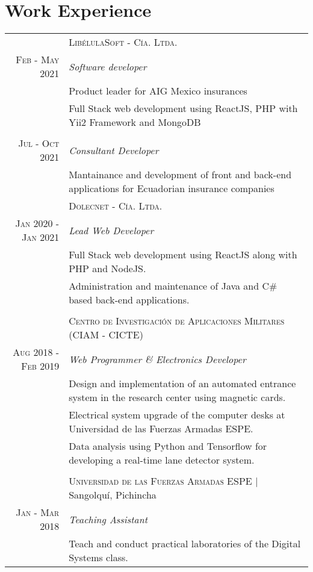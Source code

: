 \documentclass[a4paper,10.9pt]{article}
\begin{document}
\section{Work Experience}
\begin{tabular}{r|p{11cm}}
 &\textsc{LibélulaSoft - Cía. Ltda.} \\
\textsc{Feb - May 2021}&\emph{Software developer}\\
&\footnotesize{Product leader for AIG Mexico insurances}
\\
&\footnotesize{Full Stack web development using ReactJS, PHP with Yii2 Framework and MongoDB}\\
\\
\textsc{Jul - Oct 2021}&\emph{Consultant Developer}\\
&\footnotesize{Mantainance and development of front and back-end applications for Ecuadorian insurance companies}
\multicolumn{2}{c}{} \\ 
 &\textsc{Dolecnet - Cía. Ltda.} \\
\textsc{Jan 2020 - Jan 2021} &\emph{Lead Web Developer}\\&\footnotesize{Full Stack web development using ReactJS along with PHP and NodeJS.}
\\&\footnotesize{Administration and maintenance of Java and C\# based back-end applications.}\\
\multicolumn{2}{c}{} \\ 
&\textsc{Centro de Investigación de Aplicaciones Militares (CIAM - CICTE)} \\
\textsc{Aug 2018 - Feb 2019}&\emph{Web Programmer \& Electronics Developer}\\&\footnotesize{Design and implementation of an automated entrance system in the research center using magnetic cards.}\\&\footnotesize{Electrical system upgrade of the computer desks at Universidad de las Fuerzas Armadas ESPE.}\\&\footnotesize{Data analysis using Python and Tensorflow for developing a real-time lane detector system.}\\
\multicolumn{2}{c}{} \\ 
 &\textsc{Universidad de las Fuerzas Armadas ESPE} | Sangolquí, Pichincha \\
 \textsc{Jan - Mar 2018}&\emph{Teaching Assistant}\\&\footnotesize{Teach and conduct practical laboratories of the Digital Systems class.}\\


\end{tabular}
\end{document}
